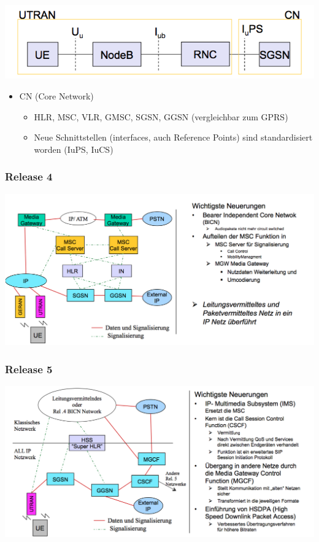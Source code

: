 \begin{minipage}{0.5\linewidth}
\includegraphics[width = \linewidth]{./Pics/UMTSArch2}
\end{minipage}
\begin{minipage}{0.5\linewidth}
\begin{itemize}
\item CN (Core Network)
\begin{itemize}
\item HLR, MSC, VLR, GMSC, SGSN, GGSN (vergleichbar zum GPRS)
\item Neue Schnittstellen (interfaces, auch Reference Points) sind standardisiert worden (IuPS, IuCS)
\end{itemize}
\end{itemize}
\end{minipage}

\begin{minipage}{0.5\linewidth}
\subsubsection{Release 4}
\includegraphics[width = \linewidth]{./Pics/UMTSArch4}
\end{minipage}
\begin{minipage}{0.5\linewidth}
\subsubsection{Release 5}
\includegraphics[width = \linewidth]{./Pics/UMTSArch5}
\end{minipage}

